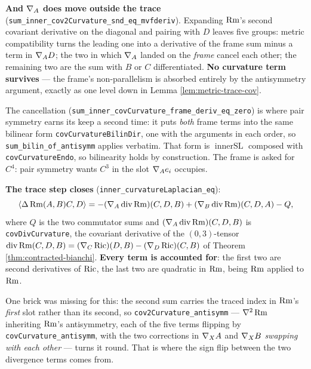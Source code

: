 \begin{lemma}
  \textbf{And $\nabla_A$ does move outside the trace}
  (\texttt{sum\_inner\_cov2Curvature\_snd\_eq\_mvfderiv}). Expanding
  $\operatorname{Rm}$'s second covariant derivative on the diagonal and pairing with $D$ leaves
  five groups: metric compatibility turns the leading one into a derivative of the
  frame sum minus a term in $\nabla_A D$; the two in which $\nabla_A$ landed on the
  \emph{frame} cancel each other; the remaining two are the sum with $B$ or $C$
  differentiated. \textbf{No curvature term survives} --- the frame's
  non-parallelism is absorbed entirely by the antisymmetry argument, exactly as
  one level down in Lemma \ref{lem:metric-trace-cov}.

  The cancellation (\texttt{sum\_inner\_covCurvature\_frame\_deriv\_eq\_zero})
  is where pair symmetry earns its keep a second time: it puts \emph{both} frame
  terms into the same bilinear form \texttt{covCurvatureBilinDir}, one with the
  arguments in each order, so \texttt{sum\_bilin\_of\_antisymm} applies verbatim.
  That form is $\operatorname{innerSL}$ composed with \texttt{covCurvatureEndo},
  so bilinearity holds by construction. The frame is asked for $C^4$: pair
  symmetry wants $C^3$ in the slot $\nabla_A e_i$ occupies.

  \textbf{The trace step closes} (\texttt{inner\_curvatureLaplacian\_eq}):
  \[
    \langle \Delta\operatorname{Rm}(A,B)C, D\rangle
      = -(\nabla_A \operatorname{div}\operatorname{Rm})(C,D,B)
        + (\nabla_B \operatorname{div}\operatorname{Rm})(C,D,A) - Q,
  \]
  where $Q$ is the two commutator sums and
  $(\nabla_A\operatorname{div}\operatorname{Rm})(C,D,B)$ is \texttt{covDivCurvature}, the
  covariant derivative of the $(0,3)$-tensor
  $\operatorname{div}\operatorname{Rm}(C,D,B) = (\nabla_C\operatorname{Ric})(D,B) - (\nabla_D\operatorname{Ric})(C,B)$ of
  Theorem \ref{thm:contracted-bianchi}. \textbf{Every term is accounted for}: the
  first two are second derivatives of $\operatorname{Ric}$, the last two are quadratic in $\operatorname{Rm}$,
  being $\operatorname{Rm}$ applied to $\operatorname{Rm}$.

  One brick was missing for this: the second sum carries the traced index in
  $\operatorname{Rm}$'s \emph{first} slot rather than its second, so
  \texttt{cov2Curvature\_antisymm} --- $\nabla^2\operatorname{Rm}$ inheriting $\operatorname{Rm}$'s
  antisymmetry, each of the five terms flipping by
  \texttt{covCurvature\_antisymm}, with the two corrections in $\nabla_X A$ and
  $\nabla_X B$ \emph{swapping with each other} --- turns it round. That is where the
  sign flip between the two divergence terms comes from.
\end{lemma}

